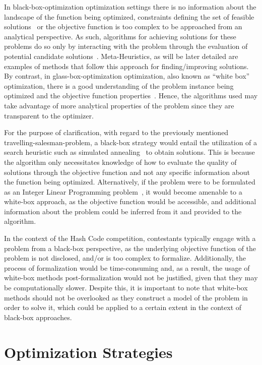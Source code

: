 In \acrshort{black-box-optimization} optimization settings there is no
information about the landscape of the function being optimized, constraints
defining the set of feasible solutions~\cite{alarie2021two} or the objective function
is too complex to be approached from an analytical perspective. As such,
algorithms for achieving solutions for these problems do so only by interacting
with the problem through the evaluation of potential candidate
solutions~\cite{doerr2020complexity}. Meta-Heuristics, as will be later detailed
are examples of methods that follow this approach for finding/improving
solutions. By contrast, in \acrfull{glass-box-optimization} optimization, also
known as ``white box'' optimization, there is a good understanding of the
problem instance being optimized and the objective function
properties~\cite{doerr2020complexity}. Hence, the algorithms used may take
advantage of more analytical properties of the problem since they are
transparent to the optimizer.

For the purpose of clarification, with regard to the previously mentioned
\acrshort{travelling-salesman-problem}, a black-box strategy would entail the
utilization of a search heuristic such as simulated
annealing~\cite{luke2013essentialsa} to obtain solutions. This is because the
algorithm only necessitates knowledge of how to evaluate the quality of
solutions through the objective function and not any specific information about
the function being optimized. Alternatively, if the problem were to be
formulated as an Integer Linear Programming
problem~\cite{nocedal2006numerical,papadimitriou1998combinatorial}, it would
become amenable to a white-box approach, as the objective function would be
accessible, and additional information about the problem could be inferred from
it and provided to the algorithm.

In the context of the Hash Code competition, contestants typically engage with a
problem from a black-box perspective, as the underlying objective function of
the problem is not disclosed, and/or is too complex to formalize. Additionally,
the process of formalization would be time-consuming and, as a result, the usage
of white-box methods post-formalization would not be justified, given that they
may be computationally slower. Despite this, it is important to note that
white-box methods should not be overlooked as they construct a model of the
problem in order to solve it, which could be applied to a certain extent in the
context of black-box approaches.

\section{Optimization Strategies}
\label{section:optimization-strategies}

